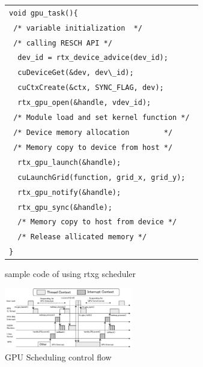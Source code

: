 \begin{figure}[t]
\begin{center}
\begin{tabular}{l}
\hline\hline
{\scriptsize \verb|void gpu_task(){        |}\\
{\scriptsize \verb| /* variable initialization  */        |}\\
{\scriptsize \verb| /* calling RESCH API */        |}\\
{\scriptsize \verb|  dev_id = rtx_device_advice(dev_id); |}\\
{\scriptsize \verb|  cuDeviceGet(&dev, dev\_id);           |}\\
{\scriptsize \verb|  cuCtxCreate(&ctx, SYNC_FLAG, dev);    |}\\
{\scriptsize \verb|  rtx_gpu_open(&handle, vdev_id);     |}\\
{\scriptsize \verb| /* Module load and set kernel function */ |}\\
{\scriptsize \verb| /* Device memory allocation        */ |}\\
{\scriptsize \verb| /* Memory copy to device from host */ |}\\
{\scriptsize \verb|  rtx_gpu_launch(&handle); |}\\
{\scriptsize \verb|  cuLaunchGrid(function, grid_x, grid_y); |}\\
{\scriptsize \verb|  rtx_gpu_notify(&handle); |}\\
{\scriptsize \verb|  rtx_gpu_sync(&handle);   |}\\
{\scriptsize \verb|  /* Memory copy to host from device */  |}\\
{\scriptsize \verb|  /* Release allicated memory */  |}\\
{\scriptsize \verb|}|}\\
\hline\hline
\end{tabular}
\caption{sample code of using rtxg scheduler}
\label{fig:sample}
\end{center}
\end{figure}

\begin{figure}[t]
\begin{center}
\includegraphics[width=0.5\textwidth]{img/gsched_controlflow.pdf}
\caption{GPU Scheduling control flow}
\end{center}
\label{fig:controlflow}
\end{figure}


